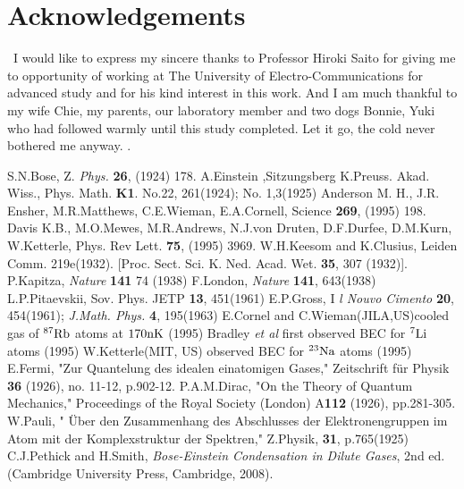 \documentclass[12pt,a4paper]{report} %
\begin{document}
\chapter*{Acknowledgements}
\ I would like to express my sincere thanks to Professor Hiroki Saito for
giving me to opportunity of working at The University of Electro-Communications
for advanced study and for his kind interest in this work.
And I am much thankful to my wife Chie, my parents, our laboratory member and two dogs Bonnie, Yuki who had followed
warmly until this study completed. Let it go, the cold never bothered me anyway. \cite{81}.

\begin{thebibliography}{81}
 S.N.Bose, Z. {\em Phys.} {\bf 26}, (1924) 178.
 A.Einstein ,Sitzungsberg K.Preuss. Akad. Wiss., Phys. Math. {\bf K1}. No.22, 261(1924); No. 1,3(1925)
 Anderson M. H., J.R. Ensher, M.R.Matthews, C.E.Wieman, E.A.Cornell, Science {\bf 269}, (1995) 198.
 Davis K.B., M.O.Mewes, M.R.Andrews, N.J.von Druten, D.F.Durfee, D.M.Kurn, W.Ketterle, Phys. Rev Lett. {\bf 75}, (1995) 3969.
 W.H.Keesom and K.Clusius, Leiden Comm. 219e(1932). [Proc. Sect. Sci. K. Ned. Acad. Wet. {\bf 35}, 307 (1932)].
 P.Kapitza, {\em Nature} {\bf 141} 74 (1938)
 F.London, {\em Nature} {\bf 141}, 643(1938)
 L.P.Pitaevskii, Sov. Phys. JETP {\bf 13}, 451(1961)
 E.P.Gross, I {\em l Nouvo Cimento} {\bf 20}, 454(1961); {\em J.Math. Phys.} {\bf 4}, 195(1963)
 E.Cornel and C.Wieman(JILA,US)cooled gas of $^{87} {\rm Rb}$ atoms at $170 {\rm nK}$ (1995)
 Bradley {\it et al} first observed BEC for $^{7} {\rm Li}$ atoms (1995)
 W.Ketterle(MIT, US) observed BEC for $^{23} {\rm Na}$ atoms (1995)
 E.Fermi, "Zur Quantelung des idealen einatomigen Gases," Zeitschrift f\"{u}r Physik {\bf 36} (1926), no. 11-12, p.902-12.
 P.A.M.Dirac, "On the Theory of Quantum Mechanics," Proceedings of the Royal Society (London) A{\bf 112} (1926), pp.281-305.
 W.Pauli, " \"{U}ber den Zusammenhang des Abschlusses der Elektronengruppen im Atom mit der Komplexstruktur der Spektren," Z.Physik, {\bf 31}, p.765(1925)
 C.J.Pethick and H.Smith, {\it Bose-Einstein Condensation in Dilute Gases}, 2nd ed. (Cambridge University Press, Cambridge, 2008).

\end{thebibliography}
\end{document}
